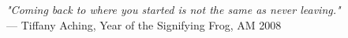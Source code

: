 \begin{flushright}
\emph{"Coming back to where you started is not the same as never leaving."}\\
 — Tiffany Aching, Year of the Signifying Frog, AM 2008
\end{flushright}